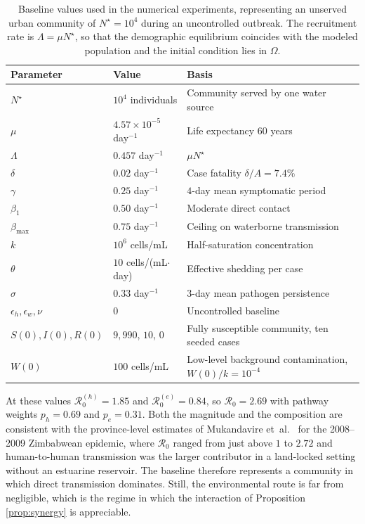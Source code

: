 \documentclass[11pt]{article}
\theoremstyle{plain}
\theoremstyle{definition}
\theoremstyle{remark}
\newcommand{\Rz}{\mathcal{R}_0}
\newcommand{\Rzh}{\mathcal{R}_0^{(h)}}
\newcommand{\Rze}{\mathcal{R}_0^{(e)}}
\begin{document}
\begin{table}[!htbp]
\centering
\caption{Baseline values used in the numerical experiments, representing an unserved urban community of $N^\star=10^4$ during an uncontrolled outbreak. The recruitment rate is $\Lambda=\mu N^\star$, so that the demographic equilibrium coincides with the modeled population and the initial condition lies in $\Omega$.}\label{tab:baseline}
\small
\begin{tabular}{@{}lll@{}}
\toprule
\textbf{Parameter} & \textbf{Value} & \textbf{Basis} \\
\midrule
$N^\star$ & $10^4$ individuals & Community served by one water source \\
$\mu$ & $4.57\times10^{-5}$ day$^{-1}$ & Life expectancy $60$ years \\
$\Lambda$ & $0.457$ day$^{-1}$ & $\mu N^\star$ \\
$\delta$ & $0.02$ day$^{-1}$ & Case fatality $\delta/A=7.4\%$ \\
$\gamma$ & $0.25$ day$^{-1}$ & $4$-day mean symptomatic period \\
$\beta_1$ & $0.50$ day$^{-1}$ & Moderate direct contact \\
$\beta_{\max}$ & $0.75$ day$^{-1}$ & Ceiling on waterborne transmission \\
$k$ & $10^6$ cells/mL & Half-saturation concentration \\
$\theta$ & $10$ cells/(mL$\cdot$day) & Effective shedding per case \\
$\sigma$ & $0.33$ day$^{-1}$ & $3$-day mean pathogen persistence \\
$\epsilon_h,\epsilon_w,\nu$ & $0$ & Uncontrolled baseline \\
\midrule
$S(0),I(0),R(0)$ & $9{,}990$, $10$, $0$ & Fully susceptible community, ten seeded cases \\
$W(0)$ & $100$ cells/mL & Low-level background contamination, $W(0)/k=10^{-4}$ \\
\bottomrule
\end{tabular}
\end{table}

At these values $\Rzh=1.85$ and $\Rze=0.84$, so $\Rz=2.69$ with pathway weights $p_h=0.69$ and $p_e=0.31$. Both the magnitude and the composition are consistent with the province-level estimates of Mukandavire et~al.\ \cite{mukandavire2011estimating} for the 2008--2009 Zimbabwean epidemic, where $\Rz$ ranged from just above $1$ to $2.72$ and human-to-human transmission was the larger contributor in a land-locked setting without an estuarine reservoir. The baseline therefore represents a community in which direct transmission dominates. Still, the environmental route is far from negligible, which is the regime in which the interaction of Proposition \ref{prop:synergy} is appreciable.
\end{document}
